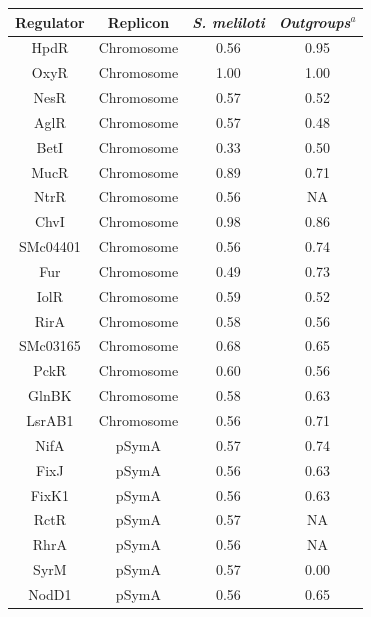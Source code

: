 \begin{table}[!ht]
\centering
\tiny
\begin{tabular}{ c c c c }
\hline
Regulator & Replicon & \textit{S. meliloti} & \emph{Outgroups}$^{a}$ \\
\hline\hline
HpdR      & Chromosome         & 0.56        & 0.95          \\
OxyR      & Chromosome         & 1.00        & 1.00          \\
NesR      &  Chromosome        & 0.57        & 0.52          \\
AglR      & Chromosome         & 0.57        & 0.48          \\
BetI      & Chromosome         & 0.33        & 0.50          \\
MucR      & Chromosome         & 0.89        & 0.71          \\
NtrR      & Chromosome         & 0.56        & NA              \\
ChvI      &  Chromosome        & 0.98        & 0.86          \\
SMc04401  & Chromosome         & 0.56        & 0.74          \\
Fur       & Chromosome         & 0.49        & 0.73          \\
IolR      & Chromosome         & 0.59        & 0.52          \\
RirA      & Chromosome         & 0.58        & 0.56          \\
SMc03165  & Chromosome         & 0.68        & 0.65          \\
PckR      & Chromosome         & 0.60        & 0.56          \\
GlnBK     & Chromosome         & 0.58        & 0.63          \\
LsrAB1    & Chromosome         & 0.56        & 0.71          \\
NifA      & pSymA         & 0.57        & 0.74          \\
FixJ      & pSymA         & 0.56        & 0.63          \\
FixK1     & pSymA         & 0.56        & 0.63          \\
RctR      & pSymA         & 0.57        & NA              \\
RhrA      & pSymA         & 0.56        & NA              \\
SyrM      & pSymA         & 0.57        & 0.00          \\
NodD1     & pSymA         & 0.56        & 0.65          \\

\end{tabular}
\end{table}
